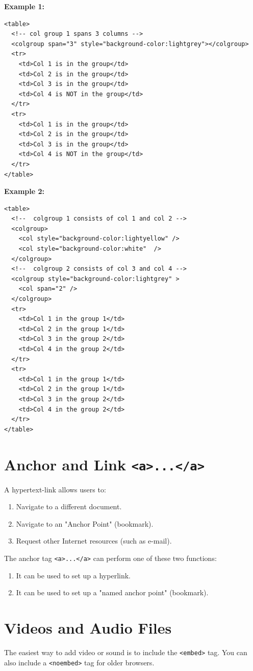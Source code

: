 \documentclass[12pt,a4paper]{article}
\begin{document}
\textbf{Example 1:}
\begin{verbatim}
<table>
  <!-- col group 1 spans 3 columns -->
  <colgroup span="3" style="background-color:lightgrey"></colgroup>
  <tr>
    <td>Col 1 is in the group</td>
    <td>Col 2 is in the group</td>
    <td>Col 3 is in the group</td>
    <td>Col 4 is NOT in the group</td>
  </tr>
  <tr>
    <td>Col 1 is in the group</td>
    <td>Col 2 is in the group</td>
    <td>Col 3 is in the group</td>
    <td>Col 4 is NOT in the group</td>
  </tr>
</table>
\end{verbatim}

\textbf{Example 2:}
\begin{verbatim}
<table>
  <!--  colgroup 1 consists of col 1 and col 2 -->
  <colgroup>
    <col style="background-color:lightyellow" />
    <col style="background-color:white"  />
  </colgroup>
  <!--  colgroup 2 consists of col 3 and col 4 -->
  <colgroup style="background-color:lightgrey" >
    <col span="2" />
  </colgroup>
  <tr>
    <td>Col 1 in the group 1</td>
    <td>Col 2 in the group 1</td>
    <td>Col 3 in the group 2</td>
    <td>Col 4 in the group 2</td>
  </tr>
  <tr>
    <td>Col 1 in the group 1</td>
    <td>Col 2 in the group 1</td>
    <td>Col 3 in the group 2</td>
    <td>Col 4 in the group 2</td>
  </tr>
</table>
\end{verbatim}

\section*{Anchor and Link \texttt{<a>...</a>}}
A hypertext-link allows users to:
\begin{enumerate}
    \item Navigate to a different document.
    \item Navigate to an "Anchor Point" (bookmark).
    \item Request other Internet resources (such as e-mail).
\end{enumerate}

The anchor tag \texttt{<a>...</a>} can perform one of these two functions:
\begin{enumerate}
    \item It can be used to set up a hyperlink.
    \item It can be used to set up a "named anchor point" (bookmark).
\end{enumerate}

\section*{Videos and Audio Files}
The easiest way to add video or sound is to include the \texttt{<embed>} tag. You can also include a \texttt{<noembed>} tag for older browsers.
\end{document}
